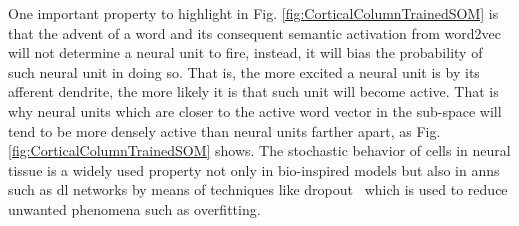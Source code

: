 {One important property to highlight in Fig. \ref{fig:CorticalColumnTrainedSOM} is that the advent of a word and its consequent semantic activation from word2vec will not determine a neural unit to fire, instead, it will bias the probability of such neural unit in doing so.
That is, the more excited a neural unit is by its afferent dendrite, the more likely it is that such unit will become active. That is why neural units which are closer to the active word vector in the sub-space will tend to be more densely active than neural units farther apart, as Fig. \ref{fig:CorticalColumnTrainedSOM} shows. The stochastic behavior of cells in neural tissue is a widely used property not only in bio-inspired models \cite{harrison_l.m_stochastic_2005} but also in \glspl{ann} such as \gls{dl} networks by means of techniques like dropout~\cite{Srivastava2014DropoutAS} which is used to reduce unwanted phenomena such as overfitting.
}








